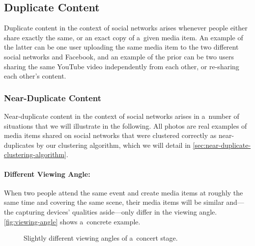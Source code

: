 \subsection{Duplicate Content}
\label{sec:duplicate-content}

Duplicate content in the context of social networks
arises whenever people either share exactly the same,
or an exact copy of a~given media item.
An example of the latter can be one user uploading the same media item
to the two different social networks \googleplus and Facebook,
and an example of the prior can be two users sharing the same
YouTube video independently from each other, or re-sharing each other's content.

\subsubsection{Near-Duplicate Content}
\label{sec:near-duplicate-content}

Near-duplicate content in the context of social networks
arises in a~number of situations
that we will illustrate in the following.
All photos are real examples of media items shared on social networks
that were clustered correctly as near-duplicates
by our clustering algorithm, which we will detail in
\autoref{sec:near-duplicate-clustering-algorithm}.

\paragraph{Different Viewing Angle:}

When two people attend the same event
and create media items at roughly the same time
and covering the same scene,
their media items will be similar
and---the capturing devices' qualities aside---only differ in the viewing angle. 
\autoref{fig:viewing-angle} shows a~concrete example.

\begin{figure}[!ht]
  \centering
  \caption{Slightly different viewing angles of a~concert stage.}
  \label{fig:viewing-angle}  
\end{figure}

